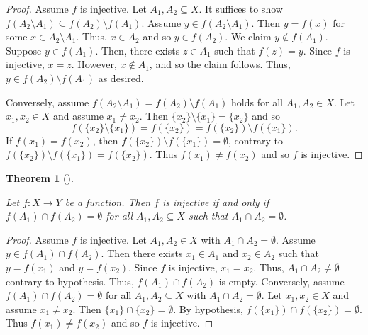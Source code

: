 \documentclass[
  letterpaper,
  10pt,
  reqno,
  twopage,
  openany]{book}
\theoremstyle{plain}
\theoremstyle{definition}
\theoremstyle{definition}
\theoremstyle{definition}
\theoremstyle{plain}
\theoremstyle{plain}
\newtheorem{theorem}{Theorem}[chapter]
\theoremstyle{remark}
\begin{document}
\begin{proof}

Assume \(f\) is injective. Let \(A_1, A_2\subseteq X\). It suffices to
show \(f(A_2\setminus A_1)\subseteq f(A_2)\setminus f(A_1)\). Assume
\(y\in f(A_2\setminus A_1)\). Then \(y=f(x)\) for some
\(x\in A_2\setminus A_1\). Thus, \(x\in A_2\) and so \(y\in f(A_2)\). We
claim \(y\not\in f(A_1)\). Suppose \(y\in f(A_1)\). Then, there exists
\(z\in A_1\) such that \(f(z)=y\). Since \(f\) is injective, \(x=z\).
However, \(x\not\in A_1\), and so the claim follows. Thus,
\(y\in f(A_2)\setminus f(A_1)\) as desired.

Conversely, assume \(f(A_2\setminus A_1)=f(A_2)\setminus f(A_1)\) holds
for all \(A_1, A_2\in X\). Let \(x_1, x_2\in X\) and assume
\(x_1\neq x_2\). Then \(\{x_2\}\setminus \{x_1\}=\{x_2\}\) and so \[
f(\{x_2\}\setminus \{x_1\})=f(\{x_2\})=f(\{x_2\})\setminus f(\{x_1\}). 
\] If \(f(x_1)=f(x_2)\), then
\(f(\{x_2\})\setminus f(\{x_1\})=\emptyset\), contrary to
\(f(\{x_2\})\setminus f(\{x_1\})=f(\{x_2\})\). Thus
\(f(x_1)\neq f(x_2)\) and so \(f\) is injective.

\end{proof}

\leavevmode{}%
\begin{theorem}[]\label{thm-injective-if-if}

Let \(f:X\to Y\) be a function. Then \(f\) is injective if and only if
\(f(A_1)\cap f(A_2)=\emptyset\) for all \(A_1, A_2\subseteq X\) such
that \(A_1\cap A_2=\emptyset\).

\end{theorem}

\begin{proof}

Assume \(f\) is injective. Let \(A_1, A_2\in X\) with
\(A_1\cap A_2=\emptyset\). Assume \(y\in f(A_1)\cap f(A_2)\). Then there
exists \(x_1\in A_1\) and \(x_2\in A_2\) such that \(y=f(x_1)\) and
\(y=f(x_2)\). Since \(f\) is injective, \(x_1=x_2\). Thus,
\(A_1\cap A_2\neq \emptyset\) contrary to hypothesis. Thus,
\(f(A_1)\cap f(A_2)\) is empty. Conversely, assume
\(f(A_1)\cap f(A_2)=\emptyset\) for all \(A_1, A_2\subseteq X\) with
\(A_1\cap A_2=\emptyset\). Let \(x_1, x_2\in X\) and assume
\(x_1\neq x_2\). Then \(\{x_1\}\cap \{x_2\}=\emptyset\). By hypothesis,
\(f(\{x_1\})\cap f(\{x_2\})=\emptyset\). Thus \(f(x_1)\neq f(x_2)\) and
so \(f\) is injective.

\end{proof}
\end{document}
